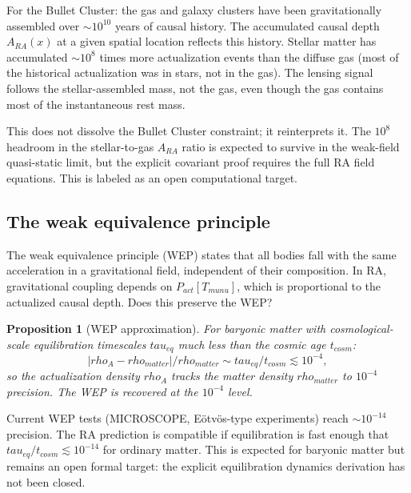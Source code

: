 \documentclass[11pt]{article}
\def\rho{rho}%
\def\mu{mu}%
\def\tau{tau}%
\def\nu{nu}%
\def\mathrm#1{#1}%
\def\frac#1#2{#1/#2}%
\newtheorem{proposition}{Proposition}
\begin{document}
For the Bullet Cluster: the gas and galaxy clusters have been gravitationally assembled over $\sim 10^{10}$ years of causal history. The accumulated causal depth $A_{\mathrm{RA}}(x)$ at a given spatial location reflects this history. Stellar matter has accumulated $\sim 10^8$ times more actualization events than the diffuse gas (most of the historical actualization was in stars, not in the gas). The lensing signal follows the stellar-assembled mass, not the gas, even though the gas contains most of the instantaneous rest mass.

This does not dissolve the Bullet Cluster constraint; it reinterprets it. The $10^8$ headroom in the stellar-to-gas $A_{\mathrm{RA}}$ ratio is expected to survive in the weak-field quasi-static limit, but the explicit covariant proof requires the full RA field equations. This is labeled as an open computational target.

\subsection{The weak equivalence principle}
\label{sec:wep}

The weak equivalence principle (WEP) states that all bodies fall with the same acceleration in a gravitational field, independent of their composition. In RA, gravitational coupling depends on $P_{\mathrm{act}}[T_{\mu\nu}]$, which is proportional to the actualized causal depth. Does this preserve the WEP?

\begin{proposition}[WEP approximation]
\label{prop:wep}
For baryonic matter with cosmological-scale equilibration timescales $\tau_{\mathrm{eq}}$ much less than the cosmic age $t_{\mathrm{cosm}}$:
\begin{equation}
\frac{|\rho_{\mathrm{A}} - \rho_{\mathrm{matter}}|}{\rho_{\mathrm{matter}}} \sim \frac{\tau_{\mathrm{eq}}}{t_{\mathrm{cosm}}} \lesssim 10^{-4},
\end{equation}
so the actualization density $\rho_{\mathrm{A}}$ tracks the matter density $\rho_{\mathrm{matter}}$ to $10^{-4}$ precision. The WEP is recovered at the $10^{-4}$ level.
\end{proposition}

Current WEP tests (MICROSCOPE, E\"otv\"os-type experiments) reach $\sim 10^{-14}$ precision. The RA prediction is compatible if equilibration is fast enough that $\tau_{\mathrm{eq}}/t_{\mathrm{cosm}} \lesssim 10^{-14}$ for ordinary matter. This is expected for baryonic matter but remains an open formal target: the explicit equilibration dynamics derivation has not been closed.
\end{document}
